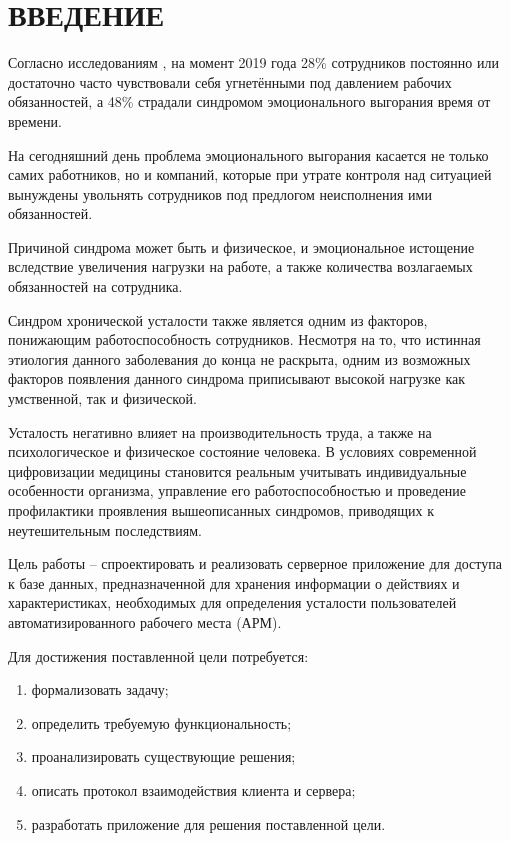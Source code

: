 \section*{ВВЕДЕНИЕ}

Согласно исследованиям \cite{burnout}, на момент 2019 года 28\% сотрудников постоянно или достаточно часто чувствовали себя угнетёнными под давлением рабочих обязанностей, а 48\% страдали синдромом эмоционального выгорания время от времени.

На сегодняшний день проблема эмоционального выгорания касается не только самих работников, но и компаний, которые при утрате контроля над ситуацией вынуждены увольнять сотрудников под предлогом неисполнения ими обязанностей. \cite{CompanyProblem}

Причиной синдрома может быть и физическое, и эмоциональное истощение вследствие увеличения нагрузки на работе, а также количества возлагаемых обязанностей на сотрудника. \cite{Prichini}

Синдром хронической усталости также является одним из факторов, понижающим работоспособность сотрудников. Несмотря на то, что истинная этиология данного заболевания до конца не раскрыта, одним из возможных факторов появления данного синдрома приписывают высокой нагрузке как умственной, так и физической. \cite{SHU}

Усталость негативно влияет на производительность труда, а также на психологическое и физическое состояние человека. В условиях современной цифровизации медицины становится реальным учитывать индивидуальные особенности организма, управление его работоспособностью и проведение профилактики проявления вышеописанных синдромов, приводящих к неутешительным последствиям.

Цель работы -- спроектировать и реализовать серверное приложение для доступа к базе данных, предназначенной для хранения информации о действиях и характеристиках, необходимых для определения усталости пользователей автоматизированного рабочего места (АРМ).

Для достижения поставленной цели потребуется:
\begin{enumerate}[leftmargin=1.6\parindent]
\item формализовать задачу;
\item определить требуемую функциональность;
\item проанализировать существующие решения;
\item описать протокол взаимодействия клиента и сервера;
\item разработать приложение для решения поставленной цели.
\end{enumerate}

\pagebreak